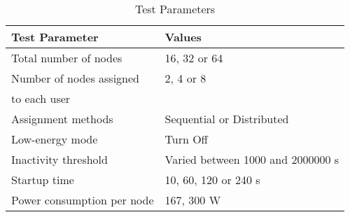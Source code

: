 \begin{table}
  \begin{center}
    \begin{tabular}{|l|l|} \hline
Test Parameter & Values \\ \hline
Total number of nodes                   & 16, 32 or 64 \\ \hline
Number of nodes assigned                & 2, 4 or 8 \\
to each user                            & \\ \hline
Assignment methods                      & Sequential or Distributed \\ \hline
Low-energy mode                         & Turn Off \\ \hline
Inactivity threshold                    & Varied between 1000 and 2000000 s \\ \hline
Startup time                            & 10, 60, 120 or 240 s \\ \hline
Power consumption per node              & 167, 300 W \\ \hline
    \end{tabular}
  \end{center}
  \caption{Test Parameters}
  \label{tbl:params}
\end{table}
